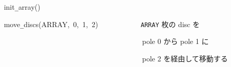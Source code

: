 \documentclass[a4paper,10pt]{article}
\def\mc{\relax}
\begin{document}
\noindent
\mbox{}{\tt\mc \ }{\tt\mc \ }{\tt\mc \ }{\tt\mc \ }init{\tt\_}array()

\noindent
\mbox{}{\tt\mc \ }{\tt\mc \ }{\tt\mc \ }{\tt\mc \ }move{\tt\_}discs(ARRAY,{\tt\mc \ }0,{\tt\mc \ }1,{\tt\mc \ }2){\tt\mc \ }{\tt\mc \ }{\tt\mc \ }{\tt\mc \ }{\tt\mc \ }{\tt\mc \ }{\tt\mc \ }{\tt\mc \ }{\tt\mc \ }{\tt\mc \ }\rm\mc {\tt\#} \ {\tt ARRAY} 枚の disc を \hfill 
\tt\mc 

\noindent
\mbox{}{\tt\mc \ }{\tt\mc \ }{\tt\mc \ }{\tt\mc \ }{\tt\mc \ }{\tt\mc \ }{\tt\mc \ }{\tt\mc \ }{\tt\mc \ }{\tt\mc \ }{\tt\mc \ }{\tt\mc \ }{\tt\mc \ }{\tt\mc \ }{\tt\mc \ }{\tt\mc \ }{\tt\mc \ }{\tt\mc \ }{\tt\mc \ }{\tt\mc \ }{\tt\mc \ }{\tt\mc \ }{\tt\mc \ }{\tt\mc \ }{\tt\mc \ }{\tt\mc \ }{\tt\mc \ }{\tt\mc \ }{\tt\mc \ }{\tt\mc \ }{\tt\mc \ }{\tt\mc \ }{\tt\mc \ }{\tt\mc \ }{\tt\mc \ }{\tt\mc \ }{\tt\mc \ }{\tt\mc \ }{\tt\mc \ }{\tt\mc \ }\rm\mc {\tt\#} \ pole 0 から pole 1 に \hfill 
\tt\mc 

\noindent
\mbox{}{\tt\mc \ }{\tt\mc \ }{\tt\mc \ }{\tt\mc \ }{\tt\mc \ }{\tt\mc \ }{\tt\mc \ }{\tt\mc \ }{\tt\mc \ }{\tt\mc \ }{\tt\mc \ }{\tt\mc \ }{\tt\mc \ }{\tt\mc \ }{\tt\mc \ }{\tt\mc \ }{\tt\mc \ }{\tt\mc \ }{\tt\mc \ }{\tt\mc \ }{\tt\mc \ }{\tt\mc \ }{\tt\mc \ }{\tt\mc \ }{\tt\mc \ }{\tt\mc \ }{\tt\mc \ }{\tt\mc \ }{\tt\mc \ }{\tt\mc \ }{\tt\mc \ }{\tt\mc \ }{\tt\mc \ }{\tt\mc \ }{\tt\mc \ }{\tt\mc \ }{\tt\mc \ }{\tt\mc \ }{\tt\mc \ }{\tt\mc \ }\rm\mc {\tt\#} \ pole 2 を経由して移動する \hfill 

\tt\mc 

\rm\mc
\end{document}
